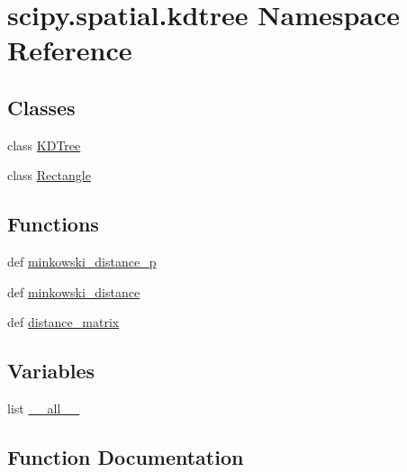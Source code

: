 \hypertarget{namespacescipy_1_1spatial_1_1kdtree}{}\section{scipy.\+spatial.\+kdtree Namespace Reference}
\label{namespacescipy_1_1spatial_1_1kdtree}
\subsection*{Classes}
\begin{DoxyCompactItemize}
\item 
class \hyperlink{classscipy_1_1spatial_1_1kdtree_1_1KDTree}{K\+D\+Tree}
\item 
class \hyperlink{classscipy_1_1spatial_1_1kdtree_1_1Rectangle}{Rectangle}
\end{DoxyCompactItemize}
\subsection*{Functions}
\begin{DoxyCompactItemize}
\item 
def \hyperlink{namespacescipy_1_1spatial_1_1kdtree_adfe086e44875d7459d774001e23609e2}{minkowski\+\_\+distance\+\_\+p}
\item 
def \hyperlink{namespacescipy_1_1spatial_1_1kdtree_a5fc1c824c3394b77a19d9391befc41b5}{minkowski\+\_\+distance}
\item 
def \hyperlink{namespacescipy_1_1spatial_1_1kdtree_aac7bf1f294f457699f05da96f013d09e}{distance\+\_\+matrix}
\end{DoxyCompactItemize}
\subsection*{Variables}
\begin{DoxyCompactItemize}
\item 
list \hyperlink{namespacescipy_1_1spatial_1_1kdtree_a291214a57c5670eae356fc5e16b85247}{\+\_\+\+\_\+all\+\_\+\+\_\+}
\end{DoxyCompactItemize}


\subsection{Function Documentation}
\hypertarget{namespacescipy_1_1spatial_1_1kdtree_aac7bf1f294f457699f05da96f013d09e}{}
